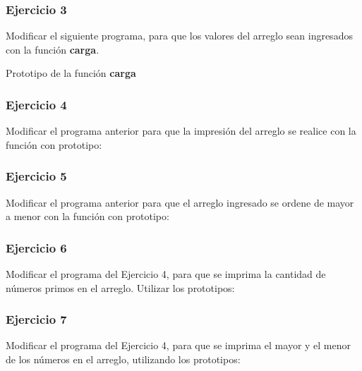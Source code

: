 \pagebreak
\subsubsection{Ejercicio 3} 
Modificar el siguiente programa, para que los valores del arreglo sean ingresados con la función \textbf{carga}.
\lstset{inputencoding=utf8/latin1}

Prototipo de la función \textbf{carga}
\lstset{inputencoding=utf8/latin1}


\subsubsection{Ejercicio 4} 
Modificar el programa anterior para que la impresión del arreglo se realice con la función con prototipo:
\lstset{inputencoding=utf8/latin1}


\subsubsection{Ejercicio 5} 
Modificar el programa anterior para que el arreglo ingresado se ordene de mayor a menor con la función con prototipo:
\lstset{inputencoding=utf8/latin1}


\subsubsection{Ejercicio 6} 
Modificar el programa del Ejercicio 4, para que se imprima la cantidad de números primos en el arreglo. Utilizar los prototipos:
\lstset{inputencoding=utf8/latin1}


\subsubsection{Ejercicio 7} 
Modificar el programa del Ejercicio 4, para que se imprima el mayor y el menor de los números en el arreglo, utilizando los prototipos:
\lstset{inputencoding=utf8/latin1}



